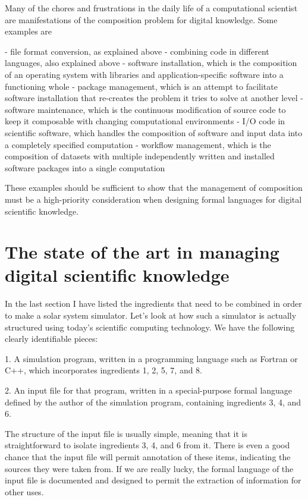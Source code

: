 Many of the chores and frustrations in the daily life of a computational scientist are manifestations of the composition problem for digital knowledge. Some examples are

 - file format conversion, as explained above
 - combining code in different languages, also explained above
 - software installation, which is the composition of an operating system with libraries and application-specific software into a functioning whole
 - package management, which is an attempt to facilitate software installation that re-creates the problem it tries to solve at another level
 - software maintenance, which is the continuous modification of source code to keep it composable with changing computational environments
 - I/O code in scientific software, which handles the composition of software and input data into a completely specified computation
 - workflow management, which is the composition of datasets with multiple independently written and installed software packages into a single computation

These examples should be sufficient to show that the management of composition must be a high-priority consideration when designing formal languages for digital scientific knowledge.

\section{The state of the art in managing digital scientific knowledge}
\label{state-of-the-art}

In the last section I have listed the ingredients that need to be combined in order to make a solar system simulator. Let's look at how such a simulator is actually structured using today's scientific computing technology. We have the following clearly identifiable pieces:

  1. A simulation program, written in a programming language such as Fortran or C++, which incorporates ingredients 1, 2, 5, 7, and 8.

  2. An input file for that program, written in a special-purpose formal language defined by the author of the simulation program, containing ingredients 3, 4, and 6.

The structure of the input file is usually simple, meaning that it is straightforward to isolate ingredients 3, 4, and 6 from it. There is even a good chance that the input file will permit annotation of these items, indicating the sources they were taken from. If we are really lucky, the formal language of the input file is documented and designed to permit the extraction of information for other uses.


